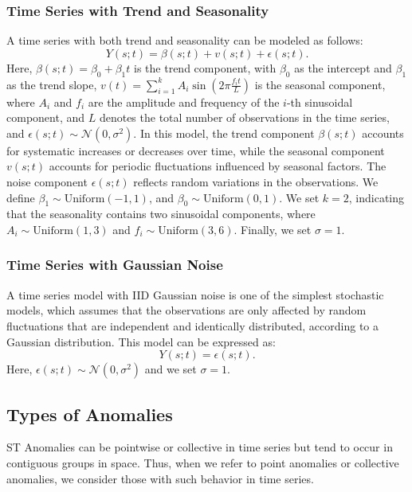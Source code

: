 \documentclass[11pt]{article}
\begin{document}
\subsubsection*{Time Series with Trend and Seasonality}
A time series with both trend and seasonality can be modeled as follows:
\begin{equation}
	Y(s;t) = \beta(s;t) + v(s;t) + \epsilon(s;t).
\end{equation}
Here, $\beta(s;t) = \beta_0 + \beta_1 t$ is the trend component, with $\beta_0$ as the intercept and $\beta_1$ as the trend slope, $v(t) = \sum_{i=1}^k A_i \sin\left(2 \pi \frac{f_i t}{L}\right)$ is the seasonal component, where $A_i$ and $f_i$ are the amplitude and frequency of the $i$-th sinusoidal component, and $L$ denotes the total number of observations in the time series, and $\epsilon(s;t) \sim \mathcal{N}(0, \sigma^2)$. In this model, the trend component $\beta(s;t)$ accounts for systematic increases or decreases over time, while the seasonal component $v(s;t)$ accounts for periodic fluctuations influenced by seasonal factors. The noise component $\epsilon(s;t)$ reflects random variations in the observations. We define $\beta_1 \sim \mathrm{Uniform}(-1, 1)$, and $\beta_0 \sim \mathrm{Uniform}(0, 1)$. We set $k = 2$, indicating that the seasonality contains two sinusoidal components, where $A_i \sim \mathrm{Uniform}(1, 3)$ and $f_i \sim \mathrm{Uniform}(3, 6)$. Finally, we set $\sigma=1$.


\subsubsection*{Time Series with Gaussian Noise}
A time series model with IID Gaussian noise is one of the simplest stochastic models, which assumes that the observations are only affected by random fluctuations that are independent and identically distributed, according to a Gaussian distribution. This model can be expressed as:
\begin{equation}
	Y(s;t) = \epsilon(s;t).
\end{equation}
Here, $\epsilon(s;t) \sim \mathcal{N}(0, \sigma^2)$ and we set $\sigma=1$.



\subsection{Types of Anomalies}
ST Anomalies can be pointwise or collective in time series but tend to occur in contiguous groups in space. Thus, when we refer to point anomalies or collective anomalies, we consider those with such behavior in time series. 
\end{document}
